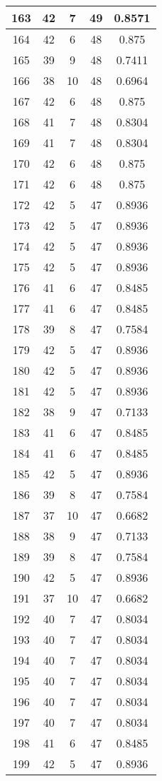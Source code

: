 \documentclass[letterpaper, 12pt]{article}
\begin{document}
\begin{longtable}{|c|c|c|c|c|}
\hline
163 & 42 & 7 & 49 & 0.8571 \\
\hline
164 & 42 & 6 & 48 & 0.875 \\
\hline
165 & 39 & 9 & 48 & 0.7411 \\
\hline
166 & 38 & 10 & 48 & 0.6964 \\
\hline
167 & 42 & 6 & 48 & 0.875 \\
\hline
168 & 41 & 7 & 48 & 0.8304 \\
\hline
169 & 41 & 7 & 48 & 0.8304 \\
\hline
170 & 42 & 6 & 48 & 0.875 \\
\hline
171 & 42 & 6 & 48 & 0.875 \\
\hline
172 & 42 & 5 & 47 & 0.8936 \\
\hline
173 & 42 & 5 & 47 & 0.8936 \\
\hline
174 & 42 & 5 & 47 & 0.8936 \\
\hline
175 & 42 & 5 & 47 & 0.8936 \\
\hline
176 & 41 & 6 & 47 & 0.8485 \\
\hline
177 & 41 & 6 & 47 & 0.8485 \\
\hline
178 & 39 & 8 & 47 & 0.7584 \\
\hline
179 & 42 & 5 & 47 & 0.8936 \\
\hline
180 & 42 & 5 & 47 & 0.8936 \\
\hline
181 & 42 & 5 & 47 & 0.8936 \\
\hline
182 & 38 & 9 & 47 & 0.7133 \\
\hline
183 & 41 & 6 & 47 & 0.8485 \\
\hline
184 & 41 & 6 & 47 & 0.8485 \\
\hline
185 & 42 & 5 & 47 & 0.8936 \\
\hline
186 & 39 & 8 & 47 & 0.7584 \\
\hline
187 & 37 & 10 & 47 & 0.6682 \\
\hline
188 & 38 & 9 & 47 & 0.7133 \\
\hline
189 & 39 & 8 & 47 & 0.7584 \\
\hline
190 & 42 & 5 & 47 & 0.8936 \\
\hline
191 & 37 & 10 & 47 & 0.6682 \\
\hline
192 & 40 & 7 & 47 & 0.8034 \\
\hline
193 & 40 & 7 & 47 & 0.8034 \\
\hline
194 & 40 & 7 & 47 & 0.8034 \\
\hline
195 & 40 & 7 & 47 & 0.8034 \\
\hline
196 & 40 & 7 & 47 & 0.8034 \\
\hline
197 & 40 & 7 & 47 & 0.8034 \\
\hline
198 & 41 & 6 & 47 & 0.8485 \\
\hline
199 & 42 & 5 & 47 & 0.8936 \\
\hline
\end{longtable}
\end{document}
